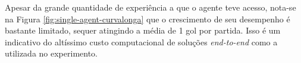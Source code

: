 Apesar da grande quantidade de experiência a que o agente teve acesso, nota-se na Figura \ref{fig:single-agent-curvalonga} que o crescimento de seu desempenho é bastante limitado, sequer atingindo a média de 1 gol por partida. Isso é um indicativo do altíssimo custo computacional de soluções \textit{end-to-end} como a utilizada no experimento.


 


